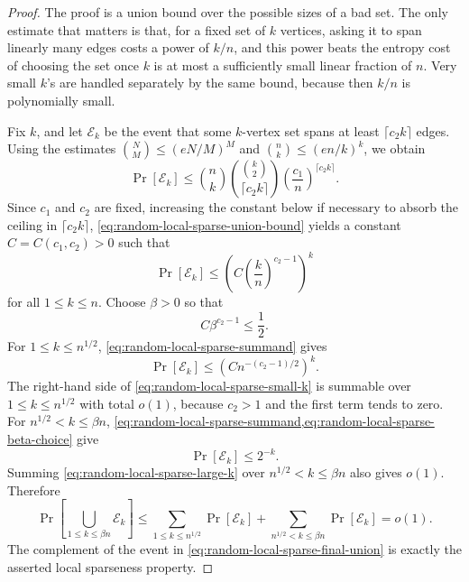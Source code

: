 \begin{proof}
	The proof is a union bound over the possible sizes of a bad set. The only estimate that matters is that, for a fixed set of \(k\) vertices, asking it to span linearly many edges costs a power of \(k/n\), and this power beats the entropy cost of choosing the set once \(k\) is at most a sufficiently small linear fraction of \(n\). Very small \(k\)'s are handled separately by the same bound, because then \(k/n\) is polynomially small.

	Fix \(k\), and let \(\mathcal{E}_k\) be the event that some \(k\)-vertex set spans at least \(\lceil c_2 k\rceil\) edges. Using the estimates \(\binom{N}{M}\leq (eN/M)^M\) and \(\binom{n}{k}\leq (en/k)^k\), we obtain
	\begin{equation}
		\label{eq:random-local-sparse-union-bound}
		\Pr[\mathcal{E}_k]\leq \binom{n}{k}\binom{\binom{k}{2}}{\lceil c_2k\rceil}\left(\frac{c_1}{n}\right)^{\lceil c_2k\rceil}.
	\end{equation}
	Since \(c_1\) and \(c_2\) are fixed, increasing the constant below if necessary to absorb the ceiling in \(\lceil c_2k\rceil\), \cref{eq:random-local-sparse-union-bound} yields a constant \(C=C(c_1,c_2)>0\) such that
	\begin{equation}
		\label{eq:random-local-sparse-summand}
		\Pr[\mathcal{E}_k]\leq \left(C\left(\frac{k}{n}\right)^{c_2-1}\right)^k
	\end{equation}
	for all \(1\leq k\leq n\). Choose \(\beta>0\) so that
	\begin{equation}
		\label{eq:random-local-sparse-beta-choice}
		C\beta^{c_2-1}\leq \frac{1}{2}.
	\end{equation}
	For \(1\leq k\leq n^{1/2}\), \cref{eq:random-local-sparse-summand} gives
	\begin{equation}
		\label{eq:random-local-sparse-small-k}
		\Pr[\mathcal{E}_k]\leq \left(Cn^{-(c_2-1)/2}\right)^k.
	\end{equation}
	The right-hand side of \cref{eq:random-local-sparse-small-k} is summable over \(1\leq k\leq n^{1/2}\) with total \(o(1)\), because \(c_2>1\) and the first term tends to zero. For \(n^{1/2}<k\leq \beta n\), \cref{eq:random-local-sparse-summand,eq:random-local-sparse-beta-choice} give
	\begin{equation}
		\label{eq:random-local-sparse-large-k}
		\Pr[\mathcal{E}_k]\leq 2^{-k}.
	\end{equation}
	Summing \cref{eq:random-local-sparse-large-k} over \(n^{1/2}<k\leq \beta n\) also gives \(o(1)\). Therefore
	\begin{equation}
		\label{eq:random-local-sparse-final-union}
		\Pr\left[\bigcup_{1\leq k\leq \beta n}\mathcal{E}_k\right]\leq \sum_{1\leq k\leq n^{1/2}}\Pr[\mathcal{E}_k]+\sum_{n^{1/2}<k\leq \beta n}\Pr[\mathcal{E}_k]=o(1).
	\end{equation}
	The complement of the event in \cref{eq:random-local-sparse-final-union} is exactly the asserted local sparseness property.
\end{proof}

